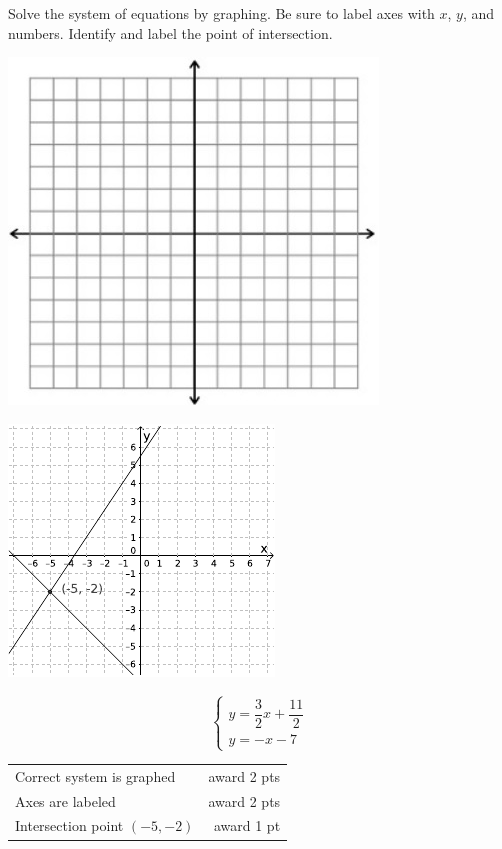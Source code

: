 {
	Solve the system of equations by graphing. Be sure to label axes with $x$, $y$, and numbers. Identify and label the point of intersection. \begin{onlyproblem}\begin{center}\includegraphics{fig-graphpaper.png}\end{center}\end{onlyproblem} \begin{onlysolution}\begin{center}\includegraphics{fig095-10-5-b-answer}\end{center}\end{onlysolution}
	$$\begin{cases} y=\dfrac{3}{2}x+\dfrac{11}{2}\\ y=-x-7\end{cases}$$
}
{
	\begin{tabular}{l r}
	Correct system is graphed & award 2 pts\\
	Axes are labeled & award 2 pts\\
	Intersection point $(-5,-2)$ & award 1 pt
	\end{tabular}
}

